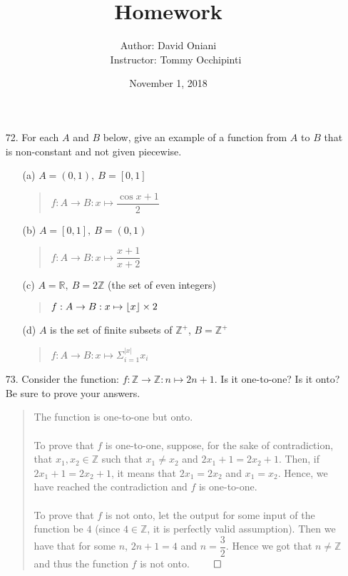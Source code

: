 \documentclass[12pt, a4paper]{article}
\title{\bf{Homework \textnumero 10}}
\author{Author: David Oniani
\\
\ \ \ Instructor: Tommy Occhipinti}
\date{November 1, 2018}
\newcommand{\ints}{\mathbb{Z}}
\newcommand{\reals}{\mathbb{R}}
\newcommand{\pints}{\mathbb{Z}^+}
\newcommand\und[1]{\underline{\smash{#1}}}
\DeclarePairedDelimiter\floor{\lfloor}{\rfloor}
\begin{document}
\maketitle

\begin{itemize}
\item[72.]
For each $A$ and $B$ below, give an example of a function from $A$ to $B$ that is non-constant and not given piecewise.
\begin{itemize}
\item[(a)]
$A = (0, 1), \ B = [0, 1]$
\begin{quote}
$f : A \rightarrow B : x \mapsto \dfrac{\cos{x} + 1}{2}$
\end{quote}

\item[]

\item[(b)]
$A = [0, 1], \ B = (0, 1)$
\begin{quote}
$f : A \rightarrow B : x \mapsto \dfrac{x + 1}{x + 2}$
\end{quote}

\item[]

\item[(c)]
$A = \reals, \ B = 2 \ints$ (the set of even integers)
\begin{quote}
$f : A \rightarrow B : x \mapsto \floor{x} \times 2$
\end{quote}

\item[]

\item[(d)]
$A$ is the set of finite subsets of $\pints$, $B = \pints$
\begin{quote}
$f : A \rightarrow B : x \mapsto \Sigma_{i = 1}^{|x|}x_i$
\end{quote}
\end{itemize}

\item[]
\item[]

\item[73.]
Consider the function: $f : \ints \rightarrow \ints : n \mapsto 2n + 1$. Is it one-to-one? Is it onto?
Be sure to prove your answers.
\begin{quote}
The function is one-to-one but \und{NOT} onto.
\\\\
To prove that $f$ is one-to-one, suppose, for the sake of contradiction, that $x_1, x_2 \in \ints$ such that $x_1 \neq x_2$
and $2x_1 + 1 = 2x_2 + 1$. Then, if $2x_1 + 1 = 2x_2 + 1$, it means that $2x_1 = 2x_2$ and $x_1 = x_2$. Hence, we have reached
the contradiction and $f$ is one-to-one.
\\\\
To prove that $f$ is not onto, let the output for some input of the function be $4$ (since $4 \in \ints$, it is perfectly valid assumption).
Then we have that for some $n$, $2n + 1 = 4$
and $n = \dfrac{3}{2}$. Hence we got that $n \neq \mathbb{Z}$ and thus the function $f$ is not onto.
$\qed$
\end{quote}


\end{itemize}
\end{document}
